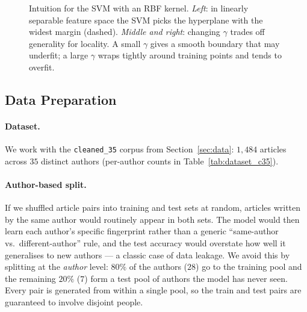 \documentclass[11pt]{article}
\begin{document}
\begin{figure}[H]
\caption{Intuition for the SVM with an RBF kernel. \textit{Left}: in
linearly separable feature space the SVM picks the hyperplane with the widest
margin (dashed). \textit{Middle and right}: changing $\gamma$ trades off
generality for locality. A small $\gamma$ gives a smooth boundary that may
underfit; a large $\gamma$ wraps tightly around training points and tends to
overfit.}
\label{fig:svm_concept}
\end{figure}

\subsection{Data Preparation}

\paragraph{Dataset.}
We work with the \texttt{cleaned\_35} corpus from Section~\ref{sec:data}:
$1{,}484$ articles across $35$ distinct authors (per-author counts in
Table~\ref{tab:dataset_c35}).

\paragraph{Author-based split.}
If we shuffled article pairs into training and test sets at random, articles
written by the same author would routinely appear in both sets. The model
would then learn each author's specific fingerprint rather than a generic
``same-author vs.\ different-author'' rule, and the test accuracy would
overstate how well it generalises to new authors --- a classic case of data
leakage. We avoid this by splitting at the \emph{author} level: $80\%$ of the
authors ($28$) go to the training pool and the remaining $20\%$ ($7$) form a
test pool of authors the model has never seen. Every pair is generated from
within a single pool, so the train and test pairs are guaranteed to involve
disjoint people.
\end{document}
